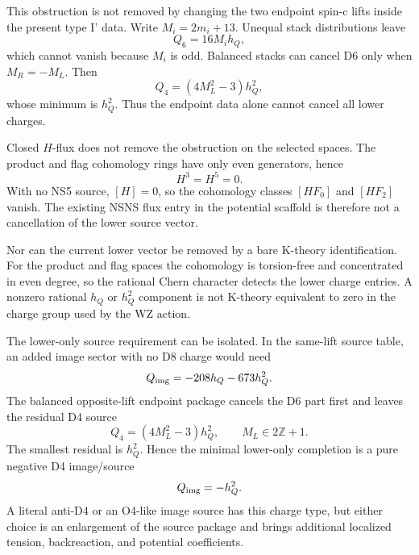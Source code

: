 \documentclass[11pt]{article}
\theoremstyle{plain}
\theoremstyle{definition}
\begin{document}
This obstruction is not removed by changing the two endpoint spin-c lifts
inside the present type I' data.  Write \(M_i=2m_i+13\).  Unequal stack
distributions leave
\begin{equation}
  Q_6=16M_i h_Q,
\end{equation}
which cannot vanish because \(M_i\) is odd.  Balanced stacks can cancel D6
only when \(M_R=-M_L\).  Then
\begin{equation}
  Q_4=(4M_L^2-3)h_Q^2,
\end{equation}
whose minimum is \(h_Q^2\).  Thus the endpoint data alone cannot cancel all
lower charges.

Closed \(H\)-flux does not remove the obstruction on the selected spaces.  The
product and flag cohomology rings have only even generators, hence
\begin{equation}
  H^3=H^5=0 .
\end{equation}
With no NS5 source, \([H]=0\), so the cohomology classes \([HF_0]\) and
\([HF_2]\) vanish.  The existing NSNS flux entry in the potential scaffold is
therefore not a cancellation of the lower source vector.

Nor can the current lower vector be removed by a bare K-theory identification.
For the product and flag spaces the cohomology is torsion-free and
concentrated in even degree, so the rational Chern character detects the
lower charge entries.  A nonzero rational \(h_Q\) or \(h_Q^2\) component is not
K-theory equivalent to zero in the charge group used by the WZ action.

The lower-only source requirement can be isolated.  In the same-lift source
table, an added image sector with no D8 charge would need
\begin{equation}
  Q_{\rm img}=-208h_Q-673h_Q^2.
\end{equation}
The balanced opposite-lift endpoint package cancels the D6 part first and
leaves the residual D4 source
\begin{equation}
  Q_4=(4M_L^2-3)h_Q^2,
  \qquad M_L\in2\mathbb Z+1.
\end{equation}
The smallest residual is \(h_Q^2\).  Hence the minimal lower-only completion is
a pure negative D4 image/source
\begin{equation}
  Q_{\rm img}=-h_Q^2.
\end{equation}
A literal anti-D4 or an O4-like image source has this charge type, but either
choice is an enlargement of the source package and brings additional localized
tension, backreaction, and potential coefficients.
\end{document}

